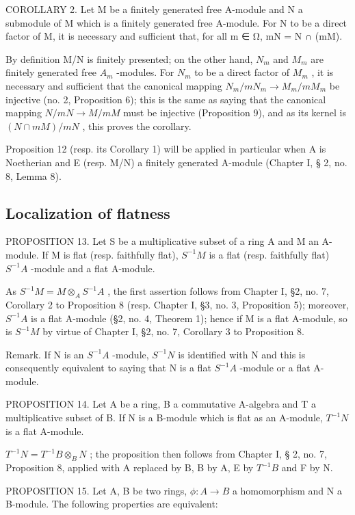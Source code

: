 COROLLARY 2. Let M be a finitely generated free A-module and N a submodule of M which is a finitely generated free A-module. For N to be a direct factor of M, it is necessary and sufficient that, for all m ∈ Ω, mN = N ∩ (mM).

By definition M/N is finitely presented; on the other hand, \(N_{m}\) and \(M_{m}\) are finitely generated free \(A_{m}\) -modules. For \(N_{m}\) to be a direct factor of \(M_{m}\) , it is necessary and sufficient that the canonical mapping \(N_{m}/mN_{m} \rightarrow M_{m}/mM_{m}\) be injective (no. 2, Proposition 6); this is the same as saying that the canonical mapping \(N/mN \rightarrow M/mM\) must be injective (Proposition 9), and as its kernel is \((N \cap mM)/mN\) , this proves the corollary.

Proposition 12 (resp. its Corollary 1) will be applied in particular when A is Noetherian and E (resp. M/N) a finitely generated A-module (Chapter I, § 2, no. 8, Lemma 8).

\subsection{Localization of flatness}

PROPOSITION 13. Let S be a multiplicative subset of a ring A and M an A-module. If M is flat (resp. faithfully flat), \(S^{-1}M\) is a flat (resp. faithfully flat) \(S^{-1}A\) -module and a flat A-module.

As \(S^{-1}M = M \otimes_{A} S^{-1}A\) , the first assertion follows from Chapter I, §2, no. 7, Corollary 2 to Proposition 8 (resp. Chapter I, §3, no. 3, Proposition 5); moreover, \(S^{-1}A\) is a flat A-module (§2, no. 4, Theorem 1); hence if M is a flat A-module, so is \(S^{-1}M\) by virtue of Chapter I, §2, no. 7, Corollary 3 to Proposition 8.

Remark. If N is an \(S^{-1}A\) -module, \(S^{-1}N\) is identified with N and this is consequently equivalent to saying that N is a flat \(S^{-1}A\) -module or a flat A-module.

PROPOSITION 14. Let A be a ring, B a commutative A-algebra and T a multiplicative subset of B. If N is a B-module which is flat as an A-module, \(T^{-1}N\) is a flat A-module.

\(T^{-1}N = T^{-1}B \otimes_{B} N\) ; the proposition then follows from Chapter I, § 2, no. 7, Proposition 8, applied with A replaced by B, B by A, E by \(T^{-1}B\) and F by N.

PROPOSITION 15. Let A, B be two rings, \(\phi: A \to B\) a homomorphism and N a B-module. The following properties are equivalent:

